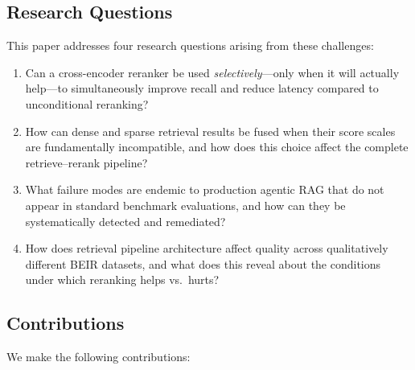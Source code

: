 \documentclass[11pt]{article}
\begin{document}
\subsection{Research Questions}

This paper addresses four research questions arising from these challenges:

\begin{enumerate}[leftmargin=1.5em, itemsep=4pt]
  \item[\textbf{RQ1.}] Can a cross-encoder reranker be used \emph{selectively}---only
  when it will actually help---to simultaneously improve recall and reduce latency
  compared to unconditional reranking?

  \item[\textbf{RQ2.}] How can dense and sparse retrieval results be fused when their
  score scales are fundamentally incompatible, and how does this choice affect the
  complete retrieve--rerank pipeline?

  \item[\textbf{RQ3.}] What failure modes are endemic to production agentic RAG that do
  not appear in standard benchmark evaluations, and how can they be systematically
  detected and remediated?

  \item[\textbf{RQ4.}] How does retrieval pipeline architecture affect quality across
  qualitatively different BEIR datasets, and what does this reveal about the conditions
  under which reranking helps vs.\ hurts?
\end{enumerate}

\subsection{Contributions}

We make the following contributions:
\end{document}
